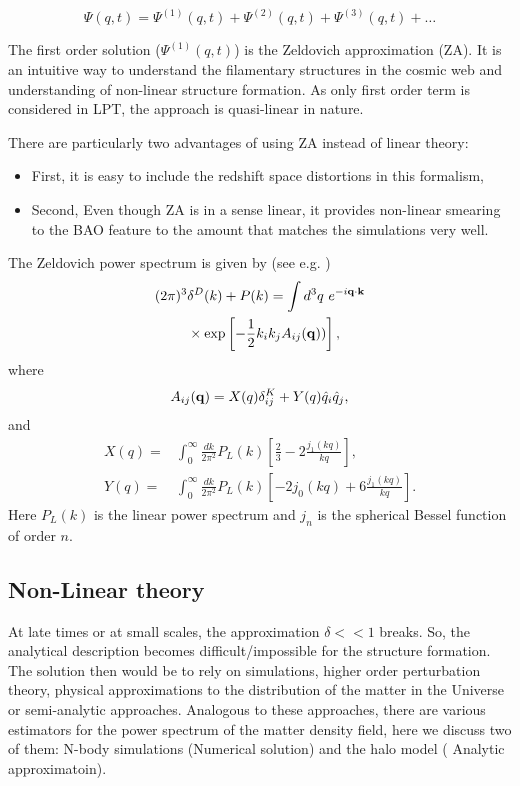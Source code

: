 \begin{equation}
	\Psi(q,t) = \Psi^{(1)}(q,t)+\Psi^{(2)}(q,t)+\Psi^{(3)}(q,t)+\dots
\end{equation}

The first order solution ($\Psi^{(1)}(q,t)$) is the Zeldovich approximation (ZA). It
is an intuitive way to understand the filamentary structures in the cosmic web 
and understanding of non-linear structure formation. As only first order term
is considered in LPT, the approach is quasi-linear in nature.

There are particularly two advantages of using ZA instead of linear theory:

\begin{itemize}
	\item First, it is easy to include the redshift space distortions in this formalism,
	\item Second, Even though ZA is in a sense linear, it provides non-linear smearing
	to the BAO feature to the amount that matches the simulations very well. 
\end{itemize}

The Zeldovich power spectrum is given by (see e.g. \cite{})
\begin{align}
(2\pi)^3&\delta^D (k)+P(k)=\int d^3 q ~e^{-i\mathbf{q}\cdot\mathbf{k}}\nonumber\\
&\times\exp\left[-\frac{1}{2}k_ik_jA_{ij}(\mathbf{q}))\right],
\label{eq:PSwithAW}
\end{align}
where 
\begin{equation}
A_{ij}(\mathbf{q})=X(q)\delta^K_{ij}+Y(q)\hat{q}_i\hat{q}_j,
\end{equation}
and
\begin{align}
  X(q) =& \int_0^\infty \frac{dk}{2\pi^2} P_L(k)
  \left[\frac{2}{3} - 2 \frac{j_1(kq)}{kq}\right] , \\
  Y(q) =& \int_0^\infty \frac{dk}{2\pi^2} P_L(k)
  \left[-2 j_0(kq) + 6 \frac{j_1(kq)}{kq}\right] .
  \label{eq:XYex}
\end{align}
Here $P_L(k)$ is the linear power spectrum and $j_n$ is the spherical Bessel function of order $n$. 

\subsection{Non-Linear theory}

At late times or at small scales, the approximation $\delta << 1$ breaks. So, the analytical
description becomes difficult/impossible for the structure formation. The solution then would 
be to rely on simulations, higher order perturbation theory, physical approximations to the
distribution of the matter in the Universe or semi-analytic approaches. Analogous to these
approaches, there are various estimators for the power spectrum of the matter density field,
here we discuss two of them: N-body simulations (Numerical solution) and the halo model (
Analytic approximatoin).

